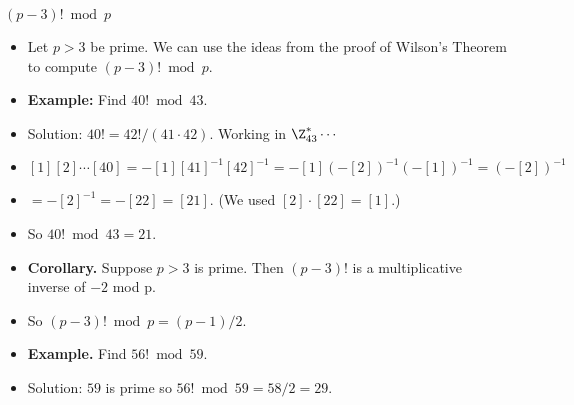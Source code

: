 \documentclass[handout]{beamer}
\begin{document}
\begin{frame}{$(p-3)! \bmod p$}
\begin{itemize}
  \item Let $p>3$ be prime. We can use the ideas from the proof of Wilson's Theorem to compute $(p-3)! \bmod p$.
  \item \textbf{Example:} Find $40!  \bmod 43$.
  \item Solution: $40! = 42!/(41\cdot 42)$. Working in $\Z_{43}^* \cdots$
  \item $[1][2]\cdots[40] = -[1][41]^{-1}[42]^{-1}=-[1](-[2])^{-1}(-[1])^{-1} = (-[2])^{-1}$
  \item $= -[2]^{-1} = -[22] = [21]$. (We used $[2] \cdot [22] = [1]$.)
  \item So $40! \bmod 43=21$.
  \item \textbf{Corollary.} Suppose $p>3$ is prime. Then $(p-3)!$ is a multiplicative inverse of $-2$ mod p.
  \item So $(p-3)! \bmod p = (p-1)/2$.
  \item \textbf{Example.} Find $56! \bmod 59$.
  \item Solution: $59$ is prime so $56!\bmod 59 = 58/2 = 29$.
\end{itemize}
\end{frame}
\end{document}
